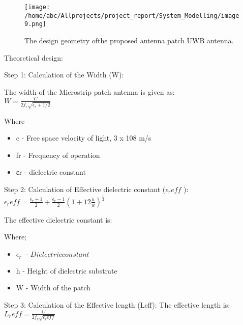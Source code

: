 	      \begin{center}
	      	 \begin{figure}[h]
	      	 	\centering
	      	 	\texttt{[image: /home/abc/Allprojects/project\_report/System\_Modelling/image9.png]}
	      	 	\caption{The design geometry ofthe proposed antenna patch UWB antenna.}
	      	 \end{figure}
	      \end{center}
         
         
		\justify
         Theoretical design:

		\justify
         Step 1: Calculation of the Width (W):
         
         The width of the Microstrip patch antenna is given as: \\	         
	        \centering 
	         $ W =  \frac{C}{ 2 f_r \sqrt{ \epsilon_r + 1 /2}} $
         
		\justify
         Where
          \begin{itemize}
          	\item  c - Free space velocity of light, 3 x 108 m/s
          	\item fr - Frequency of operation
          	\item εr - dielectric constant
          \end{itemize}
        
		\justify
         Step 2: Calculation of Effective dielectric constant ($ \epsilon_reff $ ): \\
         
         \centering
          $ \epsilon_reff = \frac{\epsilon_r + 1 }{2}  + \frac{\epsilon_r - 1 }{2}  {(1 + 12 \frac{h}{w})}^ \frac{1}{2}$
         
         
         \justify
         The effective dielectric constant is:

         Where;
	         
	         \begin{itemize}
	         	\item  $ \epsilon_r - Dielectric constant$
	         	\item h - Height of dielectric substrate
	         	\item W - Width of the patch
	         \end{itemize}
         
         \justify
         Step 3: Calculation of the Effective length (Leff):
         The effective length is:
           \centering
	           $ L_reff = \frac{C}{2 f_r \sqrt{\epsilon_reff}}	$
	
